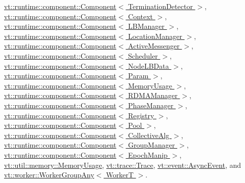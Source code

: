 \hyperlink{structvt_1_1runtime_1_1component_1_1_component_a7f07384d294e59796add9ce6be2d6410}{vt\+::runtime\+::component\+::\+Component$<$ Termination\+Detector $>$}, \hyperlink{structvt_1_1runtime_1_1component_1_1_component_a7f07384d294e59796add9ce6be2d6410}{vt\+::runtime\+::component\+::\+Component$<$ Context $>$}, \hyperlink{structvt_1_1runtime_1_1component_1_1_component_a7f07384d294e59796add9ce6be2d6410}{vt\+::runtime\+::component\+::\+Component$<$ L\+B\+Manager $>$}, \hyperlink{structvt_1_1runtime_1_1component_1_1_component_a7f07384d294e59796add9ce6be2d6410}{vt\+::runtime\+::component\+::\+Component$<$ Location\+Manager $>$}, \hyperlink{structvt_1_1runtime_1_1component_1_1_component_a7f07384d294e59796add9ce6be2d6410}{vt\+::runtime\+::component\+::\+Component$<$ Active\+Messenger $>$}, \hyperlink{structvt_1_1runtime_1_1component_1_1_component_a7f07384d294e59796add9ce6be2d6410}{vt\+::runtime\+::component\+::\+Component$<$ Scheduler $>$}, \hyperlink{structvt_1_1runtime_1_1component_1_1_component_a7f07384d294e59796add9ce6be2d6410}{vt\+::runtime\+::component\+::\+Component$<$ Node\+L\+B\+Data $>$}, \hyperlink{structvt_1_1runtime_1_1component_1_1_component_a7f07384d294e59796add9ce6be2d6410}{vt\+::runtime\+::component\+::\+Component$<$ Param $>$}, \hyperlink{structvt_1_1runtime_1_1component_1_1_component_a7f07384d294e59796add9ce6be2d6410}{vt\+::runtime\+::component\+::\+Component$<$ Memory\+Usage $>$}, \hyperlink{structvt_1_1runtime_1_1component_1_1_component_a7f07384d294e59796add9ce6be2d6410}{vt\+::runtime\+::component\+::\+Component$<$ R\+D\+M\+A\+Manager $>$}, \hyperlink{structvt_1_1runtime_1_1component_1_1_component_a7f07384d294e59796add9ce6be2d6410}{vt\+::runtime\+::component\+::\+Component$<$ Phase\+Manager $>$}, \hyperlink{structvt_1_1runtime_1_1component_1_1_component_a7f07384d294e59796add9ce6be2d6410}{vt\+::runtime\+::component\+::\+Component$<$ Registry $>$}, \hyperlink{structvt_1_1runtime_1_1component_1_1_component_a7f07384d294e59796add9ce6be2d6410}{vt\+::runtime\+::component\+::\+Component$<$ Pool $>$}, \hyperlink{structvt_1_1runtime_1_1component_1_1_component_a7f07384d294e59796add9ce6be2d6410}{vt\+::runtime\+::component\+::\+Component$<$ Collective\+Alg $>$}, \hyperlink{structvt_1_1runtime_1_1component_1_1_component_a7f07384d294e59796add9ce6be2d6410}{vt\+::runtime\+::component\+::\+Component$<$ Group\+Manager $>$}, \hyperlink{structvt_1_1runtime_1_1component_1_1_component_a7f07384d294e59796add9ce6be2d6410}{vt\+::runtime\+::component\+::\+Component$<$ Epoch\+Manip $>$}, \hyperlink{structvt_1_1util_1_1memory_1_1_memory_usage_add66c6cdabed24194310380c5a28951a}{vt\+::util\+::memory\+::\+Memory\+Usage}, \hyperlink{structvt_1_1trace_1_1_trace_a24019edd964c0a307008f8d6a0f1f825}{vt\+::trace\+::\+Trace}, \hyperlink{structvt_1_1event_1_1_async_event_ac8d9f977b1cca3f43a06d0e83bc88e3d}{vt\+::event\+::\+Async\+Event}, and \hyperlink{structvt_1_1worker_1_1_worker_group_any_ad8bb855b98bf26337ca13df2bff5fb95}{vt\+::worker\+::\+Worker\+Group\+Any$<$ Worker\+T $>$}.

